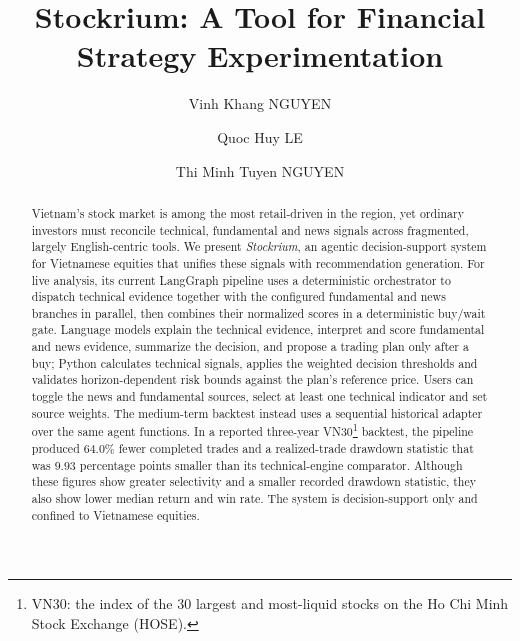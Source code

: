 \documentclass[runningheads]{llncs}
\begin{document}
%
\title{Stockrium: A Tool for Financial Strategy Experimentation}
%
%
\author{Vinh Khang NGUYEN \and
Quoc Huy LE \and
Thi Minh Tuyen NGUYEN}
%
%
%
\maketitle              %
%
\begin{abstract}
Vietnam's stock market is among the most retail-driven in the region, yet
ordinary investors must reconcile technical, fundamental and news signals across
fragmented, largely English-centric tools. We present \emph{Stockrium}, an
agentic decision-support system for Vietnamese equities that unifies these signals
with recommendation generation. For live analysis, its current LangGraph pipeline
uses a deterministic orchestrator to dispatch technical evidence together with the
configured fundamental and news branches in parallel, then combines their normalized
scores in a deterministic buy/wait gate. Language models explain the technical evidence,
interpret and score fundamental and news evidence, summarize the decision, and
propose a trading plan only after a buy; Python calculates technical signals,
applies the weighted decision thresholds and validates horizon-dependent risk
bounds against the plan's reference price. Users can toggle the news and fundamental
sources, select at least one technical indicator and set source weights. The medium-term backtest instead uses
a sequential historical adapter over the same agent functions. In a reported
three-year VN30\footnote{VN30: the index of the $30$ largest and most-liquid stocks
on the Ho Chi Minh Stock Exchange (HOSE).} backtest, the pipeline produced $64.0\%$
fewer completed trades and a realized-trade drawdown statistic that was $9.93$
percentage points smaller than its technical-engine comparator. Although these
figures show greater selectivity and a smaller recorded drawdown statistic, they
also show lower median return and win rate. The system is decision-support only and
confined to Vietnamese equities.

\end{abstract}
%
%
%
\end{document}

